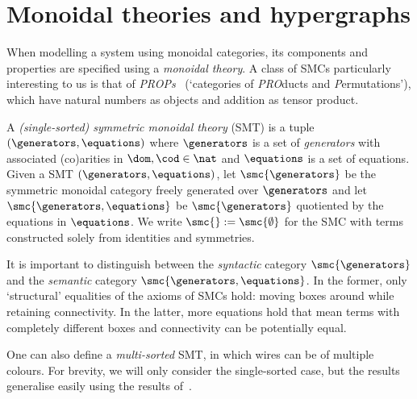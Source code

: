 \section{Monoidal theories and hypergraphs}

When modelling a system using monoidal categories, its components and
properties are specified using a \emph{monoidal theory}.
A class of SMCs particularly interesting to us is that of
\emph{PROPs}~\cite{maclane1965categorical} (`categories of \emph{PRO}ducts and
\emph{P}ermutations'), which have natural numbers as objects and addition as
tensor product.

\begin{definition}
    A \emph{(single-sorted) symmetric monoidal theory} (SMT) is a tuple \(
        (\generators,\equations)
    \) where \(\generators\) is a set of \emph{generators} with associated
    (co)arities in \(\dom,\cod \in \nat\) and \(\equations\) is a set of
    equations.
    Given a SMT \((\generators,\equations)\), let \(
        \smc{\generators}
    \) be the symmetric monoidal category freely generated over \(\generators\)
    and let \(
        \smc{\generators,\equations}
    \) be \(\smc{\generators}\) quotiented by the equations in \(\equations\).
    We write \(\smc{} := \smc{\emptyset}\) for the SMC with terms constructed
    solely from identities and symmetries.
\end{definition}

\begin{remark}
    It is important to distinguish between the \emph{syntactic} category
    \(\smc{\generators}\) and the \emph{semantic} category
    \(\smc{\generators,\equations}\).
    In the former, only `structural' equalities of the axioms of SMCs hold:
    moving boxes around while retaining connectivity.
    In the latter, more equations hold that mean terms with completely different
    boxes and connectivity can be potentially equal.
\end{remark}

\begin{remark}
    One can also define a \emph{multi-sorted} SMT, in which wires can be of
    multiple colours.
    For brevity, we will only consider the single-sorted case, but the results
    generalise easily using the results
    of~\cite{bonchi2022string,bonchi2022stringa}.
\end{remark}

